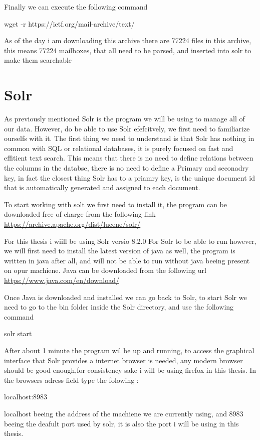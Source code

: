 \documentclass{report}
\begin{document}
Finally we can execute the following command 

wget -r https://ietf.org/mail-archive/text/ 

As of the day i am downloading this archive there are 77224 files in this archive, this means 77224 mailboxes, that all need to be parsed, and inserted into solr to make them searchable

\section{Solr}
As previously mentioned Solr is the program we will be using to manage all of our data. However, do be able to use Solr efefcitvely, we first need to familiarize ourselfs with it.
The first thing we need to understand is that Solr has nothing in common with SQL or relational databases, it is purely focused on fast and effitient text search.
This means that there is no need to define relations between the columns in the databse, there is no need to define a Primary and seconadry key, in fact the closest thing Solr has to a priamry key, is the unique document id that is automatically generated and assigned to each document.

To start working with solt we first need to install it, the program can be downloaded free of charge from the following link
\url{https://archive.apache.org/dist/lucene/solr/}

For this thesis i wiill be using Solr versio 8.2.0
For Solr to be able to run however, we will first need to install the latest version of java as well, the program is written in java after all, and will not be able to run without java beeing present on opur machiene.
Java can be downloaded from the following url
\url{https://www.java.com/en/download/}

Once Java is downloaded and installed we can go back to Solr, to start Solr we need to go to the bin folder inside the Solr directory, and use the following command 

solr start

After about 1 minute the program wil be up and running, to access the graphical interface that Solr provides a internet browser is needed, any modern browser should be good enough,for consistency sake i will be using firefox in this thesis.
In the browsers adress field type the folowing :

localhost:8983

localhost beeing the address of the machiene we are currently using, and 8983 beeing the deafult port used by solr, it is also the port i will be using in this thesis.
\end{document}
